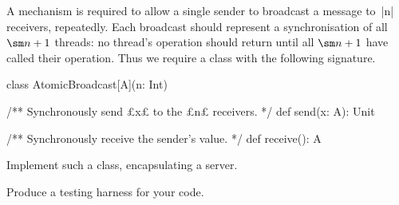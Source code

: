 \begin{questionS}
\label{ex:atomicBroadcast}
A mechanism is required to allow a single sender to broadcast a message to~|n|
receivers, repeatedly.  Each broadcast should represent a synchronisation of
all $\sm n + 1$ threads: no thread's operation should return until all $\sm
n+1$ have called their operation.  Thus we require a class with the following
signature.
%
\begin{scala}
class AtomicBroadcast[A](n: Int){
  /** Synchronously send £x£ to the £n£ receivers. */
  def send(x: A): Unit

  /** Synchronously receive the sender's value. */
  def receive(): A 
}
\end{scala}
%
Implement such a class, encapsulating a server.

Produce a testing harness for your code.
\end{questionS}


